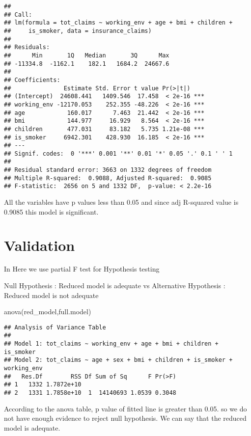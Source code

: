 \documentclass[
]{article}
\newenvironment{Shaded}{\begin{snugshade}}{\end{snugshade}}
\newcommand{\FunctionTok}[1]{\textcolor[rgb]{0.00,0.00,0.00}{#1}}
\newcommand{\NormalTok}[1]{#1}
\begin{document}
\begin{verbatim}
## 
## Call:
## lm(formula = tot_claims ~ working_env + age + bmi + children + 
##     is_smoker, data = insurance_claims)
## 
## Residuals:
##      Min       1Q   Median       3Q      Max 
## -11334.8  -1162.1    182.1   1684.2  24667.6 
## 
## Coefficients:
##               Estimate Std. Error t value Pr(>|t|)    
## (Intercept)  24608.441   1409.546  17.458  < 2e-16 ***
## working_env -12170.053    252.355 -48.226  < 2e-16 ***
## age            160.017      7.463  21.442  < 2e-16 ***
## bmi            144.977     16.929   8.564  < 2e-16 ***
## children       477.031     83.182   5.735 1.21e-08 ***
## is_smoker     6942.301    428.930  16.185  < 2e-16 ***
## ---
## Signif. codes:  0 '***' 0.001 '**' 0.01 '*' 0.05 '.' 0.1 ' ' 1
## 
## Residual standard error: 3663 on 1332 degrees of freedom
## Multiple R-squared:  0.9088, Adjusted R-squared:  0.9085 
## F-statistic:  2656 on 5 and 1332 DF,  p-value: < 2.2e-16
\end{verbatim}

All the variables have p values less than 0.05 and since adj R-squared
value is 0.9085 this model is significant.

\hypertarget{validation}{%
\section{Validation}\label{validation}}

In Here we use partial F test for Hypothesis testing

Null Hypothesis : Reduced model is adequate vs Alternative Hypothesis :
Reduced model is not adequate

\begin{Shaded}
\begin{Highlighting}[]
\FunctionTok{anova}\NormalTok{(red\_model,full.model)}
\end{Highlighting}
\end{Shaded}

\begin{verbatim}
## Analysis of Variance Table
## 
## Model 1: tot_claims ~ working_env + age + bmi + children + is_smoker
## Model 2: tot_claims ~ age + sex + bmi + children + is_smoker + working_env
##   Res.Df        RSS Df Sum of Sq      F Pr(>F)
## 1   1332 1.7872e+10                           
## 2   1331 1.7858e+10  1  14140693 1.0539 0.3048
\end{verbatim}

According to the anova table, p value of fitted line is greater than
0.05. so we do not have enough evidence to reject null hypothesis. We
can say that the reduced model is adequate.
\end{document}
